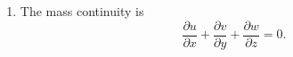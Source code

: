 \documentclass[a4paper]{article}
\begin{document}
\begin{enumerate}[label=\textbf{\arabic*.}]
\begin{enumerate}[label=\textbf{(\alph*)}]
		
		
		\item The mass continuity is 
		\begin{equation}\label{eq:mass}
			\frac { \partial u } { \partial x } + \frac { \partial v } { \partial y } + \frac { \partial w } { \partial z } = 0.
		\end{equation}
		

\end{enumerate}
\end{enumerate}
\end{document}
